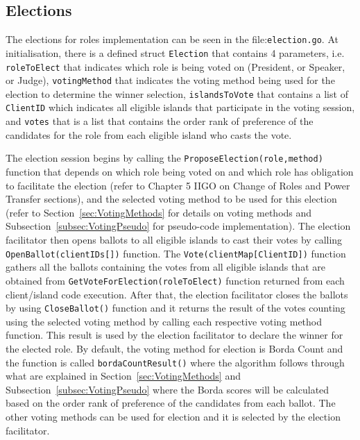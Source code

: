 \subsection{Elections}
\label{subsec:Elections}
The elections for roles implementation can be seen in the file:\texttt{election.go}. At initialisation, there is a defined struct \texttt{Election} that contains 4 parameters, i.e. \texttt{roleToElect} that indicates which role is being voted on (President, or Speaker, or Judge), \texttt{votingMethod} that indicates the voting method being used for the election to determine the winner selection, \texttt{islandsToVote} that contains a list of \texttt{ClientID} which indicates all eligible islands that participate in the voting session, and \texttt{votes} that is a list that contains the order rank of preference of the candidates for the role from each eligible island who casts the vote.

The election session begins by calling the \texttt{ProposeElection(role,method)} function that depends on which role being voted on and which role has obligation to facilitate the election (refer to Chapter 5 IIGO on Change of Roles and Power Transfer sections), and the selected voting method to be used for this election (refer to Section~\ref{sec:VotingMethods} for details on voting methods and Subsection~\ref{subsec:VotingPseudo} for pseudo-code implementation). The election facilitator then opens ballots to all eligible islands to cast their votes by calling \texttt{OpenBallot(clientIDs[])} function. The \texttt{Vote(clientMap[ClientID])} function gathers all the ballots containing the votes from all eligible islands that are obtained from \texttt{GetVoteForElection(roleToElect)} function returned from each client/island code execution. After that, the election facilitator closes the ballots by using \texttt{CloseBallot()} function and it returns the result of the votes counting using the selected voting method by calling each respective voting method function. This result is used by the election facilitator to declare the winner for the elected role. By default, the voting method for election is Borda Count and the function is called \texttt{bordaCountResult()} where the algorithm follows through what are explained in Section~\ref{sec:VotingMethods} and Subsection~\ref{subsec:VotingPseudo} where the Borda scores will be calculated based on the order rank of preference of the candidates from each ballot. The other voting methods can be used for election and it is selected by the election facilitator.

